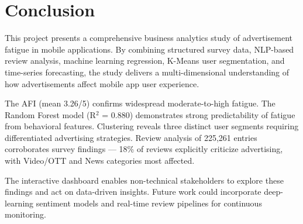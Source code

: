\documentclass[12pt]{article}
\begin{document}
\section{Conclusion}

This project presents a comprehensive business analytics study of advertisement fatigue in mobile applications. By combining structured survey data, NLP-based review analysis, machine learning regression, K-Means user segmentation, and time-series forecasting, the study delivers a multi-dimensional understanding of how advertisements affect mobile app user experience.

The AFI (mean 3.26/5) confirms widespread moderate-to-high fatigue. The Random Forest model (R$^2$ = 0.880) demonstrates strong predictability of fatigue from behavioral features. Clustering reveals three distinct user segments requiring differentiated advertising strategies. Review analysis of 225,261 entries corroborates survey findings — 18\% of reviews explicitly criticize advertising, with Video/OTT and News categories most affected.

The interactive dashboard enables non-technical stakeholders to explore these findings and act on data-driven insights. Future work could incorporate deep-learning sentiment models and real-time review pipelines for continuous monitoring.
\end{document}
